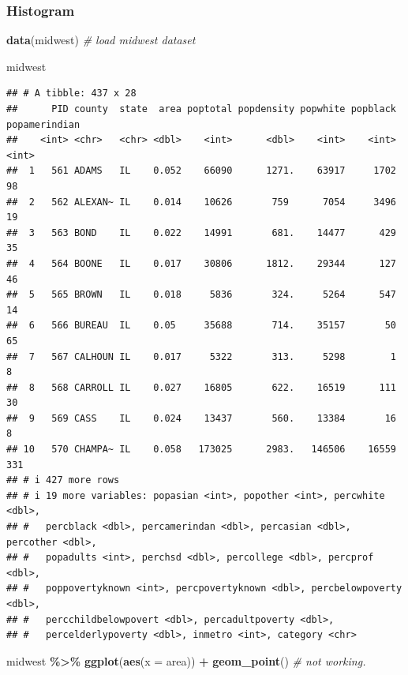\documentclass[
]{book}
\newenvironment{Shaded}{\begin{snugshade}}{\end{snugshade}}
\newcommand{\AttributeTok}[1]{\textcolor[rgb]{0.13,0.29,0.53}{#1}}
\newcommand{\CommentTok}[1]{\textcolor[rgb]{0.56,0.35,0.01}{\textit{#1}}}
\newcommand{\FunctionTok}[1]{\textcolor[rgb]{0.13,0.29,0.53}{\textbf{#1}}}
\newcommand{\NormalTok}[1]{#1}
\newcommand{\SpecialCharTok}[1]{\textcolor[rgb]{0.81,0.36,0.00}{\textbf{#1}}}
\begin{document}
\subsubsection{Histogram}\label{histogram}

\begin{Shaded}
\begin{Highlighting}[]
\FunctionTok{data}\NormalTok{(midwest) }\CommentTok{\# load midwest dataset}

\NormalTok{midwest}
\end{Highlighting}
\end{Shaded}

\begin{verbatim}
## # A tibble: 437 x 28
##      PID county  state  area poptotal popdensity popwhite popblack popamerindian
##    <int> <chr>   <chr> <dbl>    <int>      <dbl>    <int>    <int>         <int>
##  1   561 ADAMS   IL    0.052    66090      1271.    63917     1702            98
##  2   562 ALEXAN~ IL    0.014    10626       759      7054     3496            19
##  3   563 BOND    IL    0.022    14991       681.    14477      429            35
##  4   564 BOONE   IL    0.017    30806      1812.    29344      127            46
##  5   565 BROWN   IL    0.018     5836       324.     5264      547            14
##  6   566 BUREAU  IL    0.05     35688       714.    35157       50            65
##  7   567 CALHOUN IL    0.017     5322       313.     5298        1             8
##  8   568 CARROLL IL    0.027    16805       622.    16519      111            30
##  9   569 CASS    IL    0.024    13437       560.    13384       16             8
## 10   570 CHAMPA~ IL    0.058   173025      2983.   146506    16559           331
## # i 427 more rows
## # i 19 more variables: popasian <int>, popother <int>, percwhite <dbl>,
## #   percblack <dbl>, percamerindan <dbl>, percasian <dbl>, percother <dbl>,
## #   popadults <int>, perchsd <dbl>, percollege <dbl>, percprof <dbl>,
## #   poppovertyknown <int>, percpovertyknown <dbl>, percbelowpoverty <dbl>,
## #   percchildbelowpovert <dbl>, percadultpoverty <dbl>,
## #   percelderlypoverty <dbl>, inmetro <int>, category <chr>
\end{verbatim}

\begin{Shaded}
\begin{Highlighting}[]
\NormalTok{midwest }\SpecialCharTok{\%\textgreater{}\%}
  \FunctionTok{ggplot}\NormalTok{(}\FunctionTok{aes}\NormalTok{(}\AttributeTok{x =}\NormalTok{ area)) }\SpecialCharTok{+}
  \FunctionTok{geom\_point}\NormalTok{() }\CommentTok{\# not working.}
\end{Highlighting}
\end{Shaded}
\end{document}
